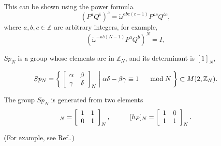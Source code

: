 \documentclass[12pt]{iopart}
\begin{document}
This can be shown using the power formula
\begin{equation}
(P^aQ^b)^c=\check\omega^{abc(c-1)}P^{ac}Q^{bc},
\end{equation}
where \(a,b,c\in\mathbb Z\) are arbitrary integers,
for example,
\begin{equation}
(\check\omega^{-ab(N-1)}P^aQ^b)^N=I,
\label{power-formula-example}
\end{equation}
%

\(Sp_N\) is a group whose elements are in
\(\mathbb Z_N\), and its determinant is \([1]_N\),

\begin{equation}
Sp_N
=
\Set{
\left[\begin{array}{cc}
\alpha & \beta \\
\gamma & \delta \\
\end{array}\right]_N
|
\alpha\delta-\beta\gamma\equiv1
\hspace{5mm}\bmod N
}
\subset M(2,\mathbb Z_N).
\end{equation}

The group \(Sp_N\) is generated from two elements
\begin{equation}
[h_Q]_N
=
\left[\begin{array}{cc}
1 & 1 \\
0 & 1 \\
\end{array}\right]_N,
\hspace{10mm}
[h_P]_N
=
\left[\begin{array}{cc}
1 & 0 \\
1 & 1 \\
\end{array}\right]_N.
\end{equation}

(For example, see Ref.\cite{Watanabe-Hashimoto-Horibe-Hayashi_2019}.)
\end{document}
